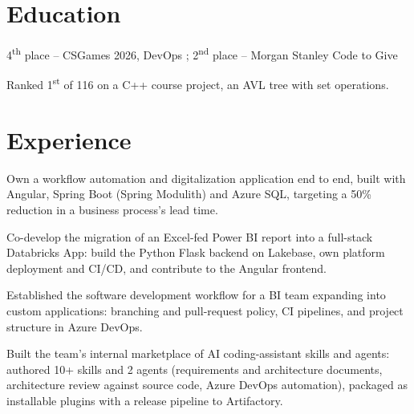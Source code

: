\documentclass[letterpaper,10pt]{article}
\begin{document}


\section{Education}

\begin{resume_list}
\item 4\textsuperscript{th} place -- CSGames 2026, DevOps ; 2\textsuperscript{nd} place -- Morgan Stanley Code to Give
\item Ranked 1\textsuperscript{st} of 116 on a C++ course project, an AVL tree with set operations. {\footnotesize {}}
\end{resume_list}

\section{Experience}

\begin{resume_list}
\item Own a workflow automation and digitalization application end to end, built with Angular, Spring Boot (Spring Modulith) and Azure SQL, targeting a 50\% reduction in a business process's lead time.
\item Co-develop the migration of an Excel-fed Power BI report into a full-stack Databricks App: build the Python Flask backend on Lakebase, own platform deployment and CI/CD, and contribute to the Angular frontend.
\item Established the software development workflow for a BI team expanding into custom applications: branching and pull-request policy, CI pipelines, and project structure in Azure DevOps.
\item Built the team's internal marketplace of AI coding-assistant skills and agents: authored 10+ skills and 2 agents (requirements and architecture documents, architecture review against source code, Azure DevOps automation), packaged as installable plugins with a release pipeline to Artifactory.
\end{resume_list}
\end{document}
